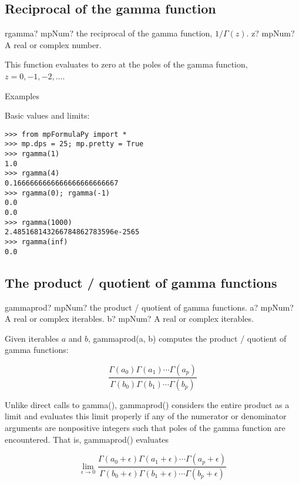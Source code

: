 \subsection{Reciprocal of the gamma function}

\begin{mpFunctionsExtract}
	\mpFunctionOne
	{rgamma? mpNum? the reciprocal of the gamma function, $1/\Gamma(z)$.}
	{z? mpNum? A real or complex number.}
\end{mpFunctionsExtract}




This function evaluates to zero at the poles of the gamma function, $z=0,-1,-2,\ldots$.

Examples

Basic values and limits:

\begin{lstlisting}
>>> from mpFormulaPy import *
>>> mp.dps = 25; mp.pretty = True
>>> rgamma(1)
1.0
>>> rgamma(4)
0.1666666666666666666666667
>>> rgamma(0); rgamma(-1)
0.0
0.0
>>> rgamma(1000)
2.485168143266784862783596e-2565
>>> rgamma(inf)
0.0
\end{lstlisting}



\subsection{The product / quotient of gamma functions}


\begin{mpFunctionsExtract}
	\mpFunctionTwo
	{gammaprod? mpNum?  the  product / quotient of gamma functions.}
	{a? mpNum? A real or complex iterables.}
	{b? mpNum? A real or complex iterables.}	
\end{mpFunctionsExtract}


\vpara
Given iterables $a$ and $b$, gammaprod(a, b) computes the product / quotient of gamma functions:

\begin{equation}
\frac{\Gamma(a_0) \Gamma(a_1) \cdots \Gamma(a_p)}{\Gamma(b_0) \Gamma(b_1) \cdots \Gamma(b_p)}
\end{equation}

Unlike direct calls to gamma(), gammaprod() considers the entire product as a limit and evaluates this limit properly if any of the numerator or denominator arguments are nonpositive integers such that poles of the gamma function are encountered. That is, gammaprod() evaluates

\begin{equation}
\lim_{\epsilon \to 0}   \frac{\Gamma(a_0 +\epsilon) \Gamma(a_1+\epsilon) \cdots \Gamma(a_p+\epsilon)}{\Gamma(b_0+\epsilon) \Gamma(b_1+\epsilon) \cdots \Gamma(b_p+\epsilon)}
\end{equation}


